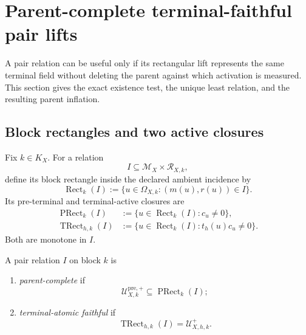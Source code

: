\section{Parent-complete terminal-faithful pair lifts}
\label{sec:tpc64-parent-faithful-lifts}

A pair relation can be useful only if its rectangular lift represents the
same terminal field without deleting the parent against which activation
is measured.  This section gives the exact existence test, the unique
least relation, and the resulting parent inflation.

\subsection{Block rectangles and two active closures}

Fix \(k\in K_X\).  For a relation
\[
 I\subseteq\mathcal M_X\times\mathcal R_{X,k},
\]
define its block rectangle inside the declared ambient incidence by
\begin{equation}
 \operatorname{Rect}_k(I)
 :=
 \{u\in\Omega_{X,k}:(m(u),r(u))\in I\}.
 \label{eq:tpc64-block-rectangle}
\end{equation}
Its pre-terminal and terminal-active closures are
\begin{align}
 \operatorname{PRect}_k(I)
 &:=
 \{u\in\operatorname{Rect}_k(I):c_u\ne0\},
 \label{eq:tpc64-block-pre-rectangle}\\
 \operatorname{TRect}_{h,k}(I)
 &:=
 \{u\in\operatorname{Rect}_k(I):t_h(u)c_u\ne0\}.
 \label{eq:tpc64-block-terminal-rectangle}
\end{align}
Both are monotone in \(I\).

\begin{definition}
\label{def:tpc64-parent-complete-terminal-faithful}
A pair relation \(I\) on block \(k\) is
\begin{enumerate}[label=\textup{(\roman*)},leftmargin=3em]
 \item \emph{parent-complete} if
 \begin{equation}
  \mathcal U_{X,k}^{\mathrm{pre},+}
  \subseteq\operatorname{PRect}_k(I);
  \label{eq:tpc64-parent-complete}
 \end{equation}
 \item \emph{terminal-atomic faithful} if
 \begin{equation}
  \operatorname{TRect}_{h,k}(I)
  =\mathcal U_{X,h,k}^{+}.
  \label{eq:tpc64-terminal-atomic-faithful}
 \end{equation}
\end{enumerate}
\end{definition}

